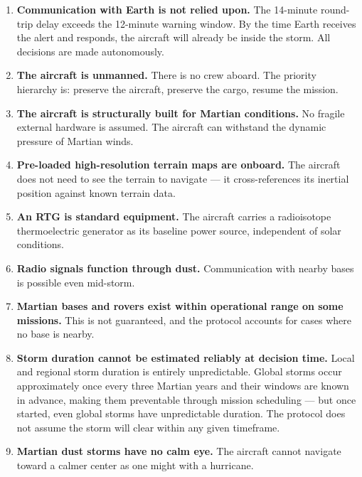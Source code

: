 \documentclass[a4paper,12pt]{article}
\begin{document}
\begin{enumerate}[itemsep=0.3em]
    \item \textbf{Communication with Earth is not relied upon.} The 14-minute round-trip delay
    exceeds the 12-minute warning window. By the time Earth receives the alert and responds,
    the aircraft will already be inside the storm. All decisions are made autonomously.

    \item \textbf{The aircraft is unmanned.} There is no crew aboard. The priority hierarchy is:
    preserve the aircraft, preserve the cargo, resume the mission.

    \item \textbf{The aircraft is structurally built for Martian conditions.} No fragile external
    hardware is assumed. The aircraft can withstand the dynamic pressure of Martian winds.

    \item \textbf{Pre-loaded high-resolution terrain maps are onboard.} The aircraft does not
    need to see the terrain to navigate — it cross-references its inertial position against
    known terrain data.

    \item \textbf{An RTG is standard equipment.} The aircraft carries a radioisotope
    thermoelectric generator as its baseline power source, independent of solar conditions.

    \item \textbf{Radio signals function through dust.} Communication with nearby bases
    is possible even mid-storm.

    \item \textbf{Martian bases and rovers exist within operational range on some missions.}
    This is not guaranteed, and the protocol accounts for cases where no base is nearby.

    \item \textbf{Storm duration cannot be estimated reliably at decision time.} Local and regional
    storm duration is entirely unpredictable. Global storms occur approximately once every three
    Martian years and their windows are known in advance, making them preventable through mission
    scheduling — but once started, even global storms have unpredictable duration. The protocol
    does not assume the storm will clear within any given timeframe.

    \item \textbf{Martian dust storms have no calm eye.} The aircraft cannot navigate toward
    a calmer center as one might with a hurricane.
\end{enumerate}
\end{document}
